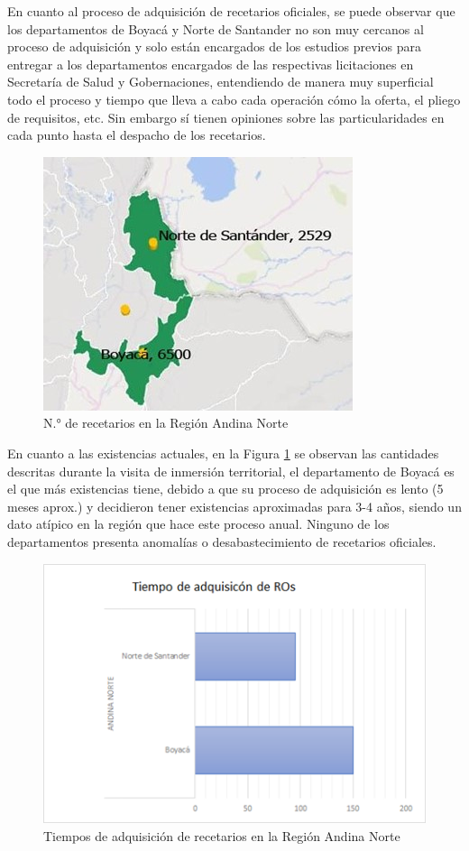 \documentclass[
]{book}
\begin{document}
En cuanto al proceso de adquisición de recetarios oficiales, se puede observar que los departamentos de Boyacá y Norte de Santander no son muy cercanos al proceso de adquisición y solo están encargados de los estudios previos para entregar a los departamentos encargados de las respectivas licitaciones en Secretaría de Salud y Gobernaciones, entendiendo de manera muy superficial todo el proceso y tiempo que lleva a cabo cada operación cómo la oferta, el pliego de requisitos, etc. Sin embargo sí tienen opiniones sobre las particularidades en cada punto hasta el despacho de los recetarios.

\begin{figure}
\includegraphics[width=0.85\linewidth]{figures/Imagen1} \caption{N.° de recetarios en la Región Andina Norte}\label{fig:NumeroRecRegAndinaNorte}
\end{figure}

En cuanto a las existencias actuales, en la Figura \ref{fig:NumeroRecRegAndinaNorte} se observan las cantidades descritas durante la visita de inmersión territorial, el departamento de Boyacá es el que más existencias tiene, debido a que su proceso de adquisición es lento (5 meses aprox.) y decidieron tener existencias aproximadas para 3-4 años, siendo un dato atípico en la región que hace este proceso anual. Ninguno de los departamentos presenta anomalías o desabastecimiento de recetarios oficiales.

\begin{figure}
\includegraphics[width=0.85\linewidth]{figures/Imagen2} \caption{Tiempos de adquisición de recetarios en la Región Andina Norte}\label{fig:TiemposAdqRecRegAndinaNorte}
\end{figure}
\end{document}

